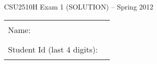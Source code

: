\documentclass[12pt]{article}                   %
\begin{document}
\vspace*{-1.5cm}
\centerline{\Large CSU2510H Exam 1 \ifrubric (SOLUTION) \fi-- Spring 2012}

\vspace{0.5cm}

\ifrubric\relax\else
\begin{center}
\begin{tabular}{l@{\qquad}l}
Name:                        & \rule{174pt}{1pt} \\[.5cm]
Student Id (last 4 digits):  & \rule{174pt}{1pt} \\[.5cm]
\end{tabular}
\end{center}
\fi
\end{document}
